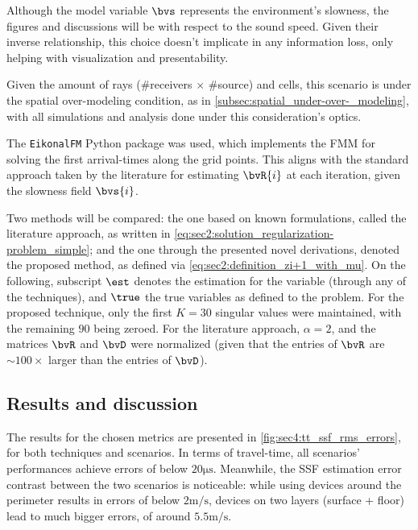 Although the model variable $\bvs$ represents the environment's slowness, the figures and discussions will be with respect to the sound speed. Given their inverse relationship, this choice doesn't implicate in any information loss, only helping with visualization and presentability.

Given the amount of rays (\#receivers $\times$ \#source) and cells, this scenario is under the spatial over-modeling condition, as in \cref{subsec:spatial_under-over-_modeling}, with all simulations and analysis done under this consideration's optics.

The \texttt{EikonalFM} Python package \cite{ganster_eikonalfm_2025} was used, which implements the FMM \cite{sethian_fast_1999,chopp_improvements_2001} for solving the first arrival-times along the grid points. This aligns with the standard approach taken by the literature for estimating $\bvR{i}$ at each iteration, given the slowness field $\bvs{i}$.

Two methods will be compared: the one based on known formulations, called the literature approach, as written in \cref{eq:sec2:solution_regularization-problem_simple}; and the one through the presented novel derivations, denoted the proposed method, as defined via \cref{eq:sec2:definition_zi+1_with_mu}. On the following, subscript $\est$ denotes the estimation for the variable (through any of the techniques), and $\true$ the true variables as defined to the problem. For the proposed technique, only the first $K=30$ singular values were maintained, with the remaining $90$ being zeroed. For the literature approach, $\alpha = 2$, and the matrices $\bvR$ and $\bvD$ were normalized (given that the entries of $\bvR$ are $\sim100\times$ larger than the entries of $\bvD$).





\subsection{Results and discussion}

The results for the chosen metrics are presented in \cref{fig:sec4:tt_ssf_rms_errors}, for both techniques and scenarios. In terms of travel-time, all scenarios' performances achieve errors of below $20\si{\micro\second}$. Meanwhile, the SSF estimation error contrast between the two scenarios is noticeable: while using devices around the perimeter results in errors of below $2\si{\meter/\second}$, devices on two layers (surface + floor) lead to much bigger errors, of around $5.5\si{\meter/\second}$.

